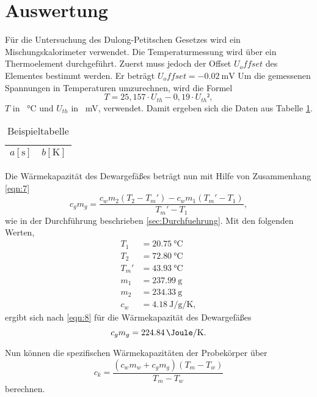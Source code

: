 \section{Auswertung}
\label{sec:Auswertung}

Für die Untersuchung des Dulong-Petitschen Gesetzes wird ein Mischungskalorimeter verwendet.
Die Temperaturmessung wird über ein Thermoelement durchgeführt.
Zuerst muss jedoch der Offset $U_offset$ des Elementes bestimmt werden.
Er beträgt $U_offset= \SI{-0,02}{\milli\volt}$
Um die gemessenen Spannungen in Temperaturen umzurechnen, wird die Formel
\begin{equation}
  T = 25,157 \cdot U_{th} - 0,19 \cdot U_{th}²,
\end{equation}
$T$ in \SI{}{\celsius} und $U_{th}$ in \SI{}{\milli\volt}, verwendet.
Damit ergeben sich die Daten aus Tabelle \ref{tab:1}.
\begin{table}
  \centering
  \caption{Beispieltabelle}
  \label{tab:1}
  \begin{tabular}{c c}
    \toprule
    {$a [\si{\second}]$} & {$b [\si{\kelvin}]$}\\
    \midrule
    
    \bottomrule
  \end{tabular}
\end{table}
Die Wärmekapazität des Dewargefäßes beträgt nun mit Hilfe von Zusammenhang \ref{eqn:7}
\begin{equation}
  c_gm_g = \frac{c_wm_2(T_2-T_m')-c_wm_1(T_m'-T_1)}{T_m'-T_1},
  \label{eqn:8}
\end{equation}
wie in der Durchführung beschrieben \ref{sec:Durchfuehrung}.
Mit den folgenden Werten,
\begin{align}
  T_1 &= \SI{20,75}{\celsius} \\
  T_2 &= \SI{72,80}{\celsius} \\
  T_m'&= \SI{43,93}{\celsius} \\
  m_1 &= \SI{237,99}{\gram} \\
  m_2 &= \SI{234,33}{\gram} \\
  c_w &= \SI{4,18}{\joule\per\gram\per\kelvin},
\end{align}
ergibt sich nach \ref{eqn:8} für die Wärmekapazität des Dewargefäßes
\begin{equation}
  c_gm_g = \SI{224,84}{\Joule\per\kelvin}.
\end{equation}

Nun können die spezifischen Wärmekapazitäten der Probekörper über
\begin{equation}
  c_k = \frac{(c_wm_w+c_gm_g)(T_m-T_w)}{T_m-T_w}
\end{equation}
berechnen.
